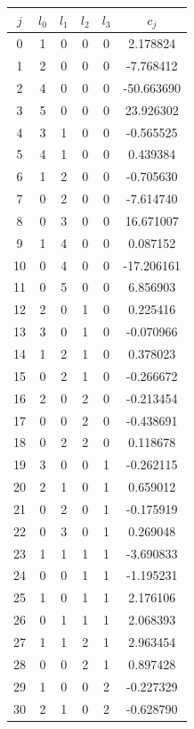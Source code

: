 \documentclass[preprint,12pt]{elsarticle}
\begin{document}
\begin{table}
\begin{minipage}[!h]{0.25\textwidth}
{\begin{tabular}{|c|cccc|c|}
\hline
$j$ &  $l_0$ &  $l_1$ &  $l_2$ &  $l_3$ &  $c_j$ \\
\hline
0  &   1 &   0 &   0 &   0 &   2.178824 \\
1  &   2 &   0 &   0 &   0 &  -7.768412 \\
2  &   4 &   0 &   0 &   0 & -50.663690 \\
3  &   5 &   0 &   0 &   0 &  23.926302 \\
4  &   3 &   1 &   0 &   0 &  -0.565525 \\
5  &   4 &   1 &   0 &   0 &   0.439384 \\
6  &   1 &   2 &   0 &   0 &  -0.705630 \\
7  &   0 &   2 &   0 &   0 &  -7.614740 \\
8  &   0 &   3 &   0 &   0 &  16.671007 \\
9  &   1 &   4 &   0 &   0 &   0.087152 \\
10 &   0 &   4 &   0 &   0 & -17.206161 \\
11 &   0 &   5 &   0 &   0 &   6.856903 \\
12 &   2 &   0 &   1 &   0 &   0.225416 \\
13 &   3 &   0 &   1 &   0 &  -0.070966 \\
14 &   1 &   2 &   1 &   0 &   0.378023 \\
15 &   0 &   2 &   1 &   0 &  -0.266672 \\
16 &   2 &   0 &   2 &   0 &  -0.213454 \\
17 &   0 &   0 &   2 &   0 &  -0.438691 \\
18 &   0 &   2 &   2 &   0 &   0.118678 \\
19 &   3 &   0 &   0 &   1 &  -0.262115 \\
20 &   2 &   1 &   0 &   1 &   0.659012 \\
21 &   0 &   2 &   0 &   1 &  -0.175919 \\
22 &   0 &   3 &   0 &   1 &   0.269048 \\
23 &   1 &   1 &   1 &   1 &  -3.690833 \\
24 &   0 &   0 &   1 &   1 &  -1.195231 \\
25 &   1 &   0 &   1 &   1 &   2.176106 \\
26 &   0 &   1 &   1 &   1 &   2.068393 \\
27 &   1 &   1 &   2 &   1 &   2.963454 \\
28 &   0 &   0 &   2 &   1 &   0.897428 \\
29 &   1 &   0 &   0 &   2 &  -0.227329 \\
30 &   2 &   1 &   0 &   2 &  -0.628790 \\

\end{tabular}}
\end{minipage}
\end{table}
\end{document}
